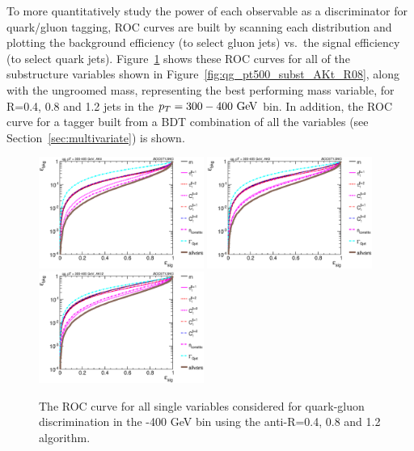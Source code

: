 To more quantitatively study the power of each observable as a
discriminator for quark/gluon tagging, ROC curves are built by scanning each distribution
and plotting the background efficiency (to select gluon jets) vs.~the signal efficiency (to select quark jets). 
Figure~\ref{fig:qg_pt300_single} shows these ROC curves for all of the
substructure variables shown in 
Figure~\ref{fig:qg_pt500_subst_AKt_R08}, along with the ungroomed mass, representing the 
best performing mass variable, for R=0.4, 0.8 and 1.2 jets in the $\pt=300-400\GeV$
bin. In addition, the ROC curve for a tagger built from a BDT
combination of all the variables (see Section~\ref{sec:multivariate}) is shown.
%
\begin{figure}
\centering
\includegraphics[width=0.48\textwidth]{./Figures/QGTagging/pT300/AKtR04/Rocs_1D_single.eps}
\includegraphics[width=0.48\textwidth]{./Figures/QGTagging/pT300/AKtR08/Rocs_1D_single.eps}
\includegraphics[width=0.48\textwidth]{./Figures/QGTagging/pT300/AKtR12/Rocs_1D_single.eps}
\caption{The ROC curve for all single variables considered for
  quark-gluon discrimination in the -400 GeV bin using the
  anti-\kT R=0.4, 0.8 and 1.2 algorithm.%
}
\label{fig:qg_pt300_single}
\end{figure}

